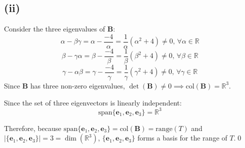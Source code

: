 \documentclass[a4paper]{article}
\newcommand{\vv}{\mathbf}
\newcommand{\spn}{\mathrm{span}}
\newcommand{\col}{\mathrm{col}}
\newcommand{\range}{\mathrm{range}}
\begin{document}
\subsection*{(ii)}
Consider the three eigenvalues of \(\vv B\):
\[\alpha-\beta\gamma=\alpha-\frac{-4}\alpha=\frac1\alpha\left(\alpha^2+4\right)\ne0,\,\forall\alpha\in\mathbb R\]
\[\beta-\gamma\alpha=\beta-\frac{-4}\beta=\frac1\beta\left(\beta^2+4\right)\ne0,\,\forall\beta\in\mathbb R\]
\[\gamma-\alpha\beta=\gamma-\frac{-4}\gamma=\frac1\gamma\left(\gamma^2+4\right)\ne0,\,\forall\gamma\in\mathbb R\]
Since \(\vv B\) has three non-zero eigenvalues, \(\det(\vv B)\ne0\implies\col(\vv B)=\mathbb R^3\).

Since the set of three eigenvectors is linearly independent:
\[\spn\{\vv e_1,\vv e_2,\vv e_3\}=\mathbb R^3\]

Therefore, because \(\spn\{\vv e_1,\vv e_2,\vv e_3\}=\col(\vv B)=\range(T)\) and \(|\{\vv e_1,\vv e_2,\vv e_3\}|=3=\dim\left(\mathbb R^3\right)\), \(\{\vv e_1,\vv e_2,\vv e_3\}\) forms a basis for the range of \(T\).\qed
\end{document}
